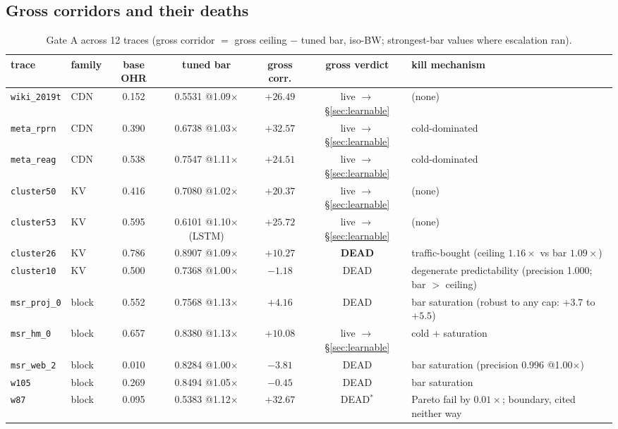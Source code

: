 \documentclass[11pt]{article}
\newcommand{\x}{$\times$}
\begin{document}
\subsection{Gross corridors and their deaths}
\begin{table}[t]\centering\footnotesize
\setlength{\tabcolsep}{4pt}
\caption{Gate A across 12 traces (gross corridor $=$ gross ceiling $-$ tuned bar, iso-BW; strongest-bar values where escalation ran).}
\label{tab:gatea}
\begin{tabular}{llccccp{4.3cm}}
\toprule
trace & family & base OHR & tuned bar & gross corr. & gross verdict & kill mechanism \\
\midrule
\texttt{wiki\_2019t} & CDN & 0.152 & 0.5531 @1.09\x & $+26.49$ & live $\to$\S\ref{sec:learnable} & (none) \\
\texttt{meta\_rprn} & CDN & 0.390 & 0.6738 @1.03\x & $+32.57$ & live $\to$\S\ref{sec:learnable} & cold-dominated \\
\texttt{meta\_reag} & CDN & 0.538 & 0.7547 @1.11\x & $+24.51$ & live $\to$\S\ref{sec:learnable} & cold-dominated \\
\texttt{cluster50} & KV & 0.416 & 0.7080 @1.02\x & $+20.37$ & live $\to$\S\ref{sec:learnable} & (none) \\
\texttt{cluster53} & KV & 0.595 & 0.6101 @1.10\x (LSTM) & $+25.72$ & live $\to$\S\ref{sec:learnable} & (none) \\
\texttt{cluster26} & KV & 0.786 & 0.8907 @1.09\x & $+10.27$ & \textbf{DEAD} & traffic-bought (ceiling $1.16\times$ vs bar $1.09\times$) \\
\texttt{cluster10} & KV & 0.500 & 0.7368 @1.00\x & $-1.18$ & DEAD & degenerate predictability (precision 1.000; bar $>$ ceiling) \\
\texttt{msr\_proj\_0} & block & 0.552 & 0.7568 @1.13\x & $+4.16$ & DEAD & bar saturation (robust to any cap: $+3.7$ to $+5.5$) \\
\texttt{msr\_hm\_0} & block & 0.657 & 0.8380 @1.13\x & $+10.08$ & live $\to$\S\ref{sec:learnable} & cold $+$ saturation \\
\texttt{msr\_web\_2} & block & 0.010 & 0.8284 @1.00\x & $-3.81$ & DEAD & bar saturation (precision 0.996 @1.00\x) \\
\texttt{w105} & block & 0.269 & 0.8494 @1.05\x & $-0.45$ & DEAD & bar saturation \\
\texttt{w87} & block & 0.095 & 0.5383 @1.12\x & $+32.67$ & DEAD$^{*}$ & Pareto fail by $0.01\times$; boundary, cited neither way \\
\bottomrule
\end{tabular}
\end{table}
\end{document}
